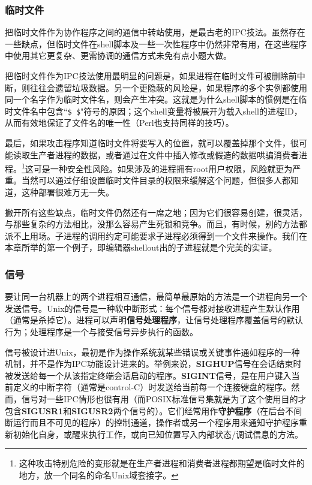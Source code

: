 \documentclass[12pt,oneside]{book}
\begin{document}
\begin{common-format}
\subsubsection{临时文件}
把临时文件作为协作程序之间的通信中转站使用，是最古老的IPC技法。虽然存在一些缺点，但临时文件在shell脚本及一些一次性程序中仍然非常有用，在这些程序中使用其它更复杂、更需协调的通信方式未免有点小题大做。

把临时文件作为IPC技法使用最明显的问题是，如果进程在临时文件可被删除前中断，则往往会遗留垃圾数据。另一个更隐蔽的风险是，如果程序的多个实例都使用同一个名字作为临时文件名，则会产生冲突。这就是为什么shell脚本的惯例是在临时文件名中包含“\verb+$ $+"符号的原因；这个shell变量将被展开为载入shell的进程ID，从而有效地保证了文件名的唯一性（Perl也支持同样的技巧）。

最后，如果攻击程序知道临时文件将要写入的位置，就可以覆盖掉那个文件，很可能读取生产者进程的数据，或者通过在文件中插入修改或假造的数据哄骗消费者进程。\footnote{这种攻击特别危险的变形就是在生产者进程和消费者进程都期望是临时文件的地方，放一个同名的命名Unix域套接字。}这可是一种安全性风险。如果涉及的进程拥有root用户权限，风险就更为严重。当然可以通过仔细设置临时文件目录的权限来缓解这个问题，但很多人都知道，这种部署很难万无一失。

撇开所有这些缺点，临时文件仍然还有一席之地；因为它们很容易创建，很灵活，与那些复杂的方法相比，没那么容易产生死锁和竞争。而且，有时候，别的方法都派不上用场。子进程的调用约定可能要求子进程必须得到一个文件来操作。我们在本章所举的第一个例子，即编辑器shellout出的子进程就是个完美的实证。


\subsubsection{信号}
要让同一台机器上的两个进程相互通信，最简单最原始的方法是一个进程向另一个发送信号。Unix的信号是一种软中断形式：每个信号都对接收进程产生默认作用（通常是杀掉它）。进程可以声明\textbf{信号处理程序}，让信号处理程序覆盖信号的默认行为；处理程序是一个与接受信号异步执行的函数。

信号被设计进Unix，最初是作为操作系统就某些错误或关键事件通如程序的一种机制，并不是作为IPC功能设计进来的。举例来说，\textbf{SIGHUP}信号在会话结束时被发送给每一个从该指定终端会话启动的程序。\textbf{SIGINT}信号，是在用户键入当前定义的中断字符（通常是control-C）时发送给当前每一个连接键盘的程序。然而，信号对一些IPC情形也很有用（而POSIX标准信号集就是为了这个使用目的才包含\textbf{SIGUSR1}和\textbf{SIGUSR2}两个信号的）。它们经常用作\textbf{守护程序}（在后台不间断运行而且不可见的程序）的控制通道，操作者或另一个程序用来通知守护程序重新初始化自身，或醒来执行工作，或向已知位置写入内部状态/调试信息的方法。


\end{common-format}
\end{document}
